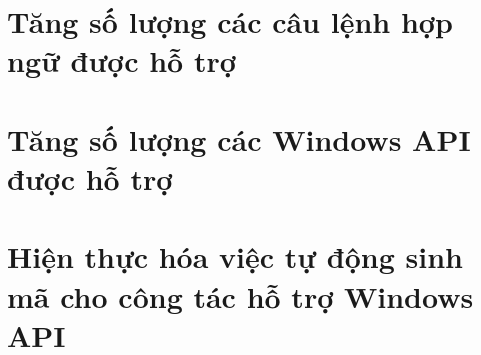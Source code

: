\section{Tăng số lượng các câu lệnh hợp ngữ được hỗ trợ}

\section{Tăng số lượng các Windows API được hỗ trợ}

\section{Hiện thực hóa việc tự động sinh mã cho công tác hỗ trợ Windows API}